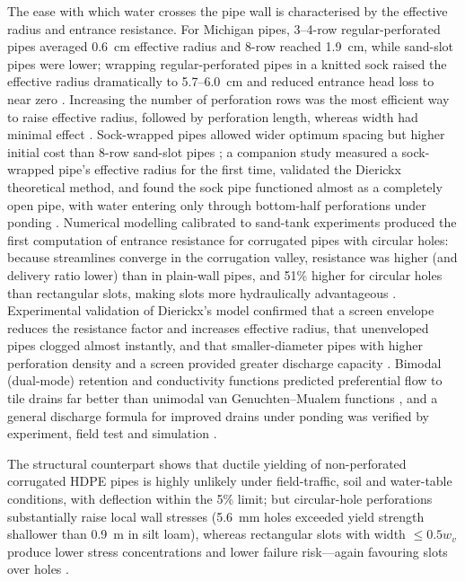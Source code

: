 The ease with which water crosses the pipe wall is characterised by the effective radius and entrance resistance. For Michigan pipes, 3--4-row regular-perforated pipes averaged 0.6~cm effective radius and 8-row reached 1.9~cm, while sand-slot pipes were lower; wrapping regular-perforated pipes in a knitted sock raised the effective radius dramatically to 5.7--6.0~cm and reduced entrance head loss to near zero \parencite{Ghane2022b}. Increasing the number of perforation rows was the most efficient way to raise effective radius, followed by perforation length, whereas width had minimal effect \parencite{Ghane2022b}. Sock-wrapped pipes allowed wider optimum spacing but higher initial cost than 8-row sand-slot pipes \parencite{Ghane2022b}; a companion study measured a sock-wrapped pipe's effective radius for the first time, validated the Dierickx theoretical method, and found the sock pipe functioned almost as a completely open pipe, with water entering only through bottom-half perforations under ponding \parencite{Ghane2022}. Numerical modelling calibrated to sand-tank experiments produced the first computation of entrance resistance for corrugated pipes with circular holes: because streamlines converge in the corrugation valley, resistance was higher (and delivery ratio lower) than in plain-wall pipes, and 51\% higher for circular holes than rectangular slots, making slots more hydraulically advantageous \parencite{Gaj2020}. Experimental validation of Dierickx's model confirmed that a screen envelope reduces the resistance factor and increases effective radius, that unenveloped pipes clogged almost instantly, and that smaller-diameter pipes with higher perforation density and a screen provided greater discharge capacity \parencite{Oyarce2017}. Bimodal (dual-mode) retention and conductivity functions predicted preferential flow to tile drains far better than unimodal van Genuchten--Mualem functions \parencite{Mohanty1997}, and a general discharge formula for improved drains under ponding was verified by experiment, field test and simulation \parencite{Tao2019}.

The structural counterpart shows that ductile yielding of non-perforated corrugated HDPE pipes is highly unlikely under field-traffic, soil and water-table conditions, with deflection within the 5\% limit; but circular-hole perforations substantially raise local wall stresses (5.6~mm holes exceeded yield strength shallower than 0.9~m in silt loam), whereas rectangular slots with width $\le 0.5w_v$ produce lower stress concentrations and lower failure risk---again favouring slots over holes \parencite{Gaj2021}.

